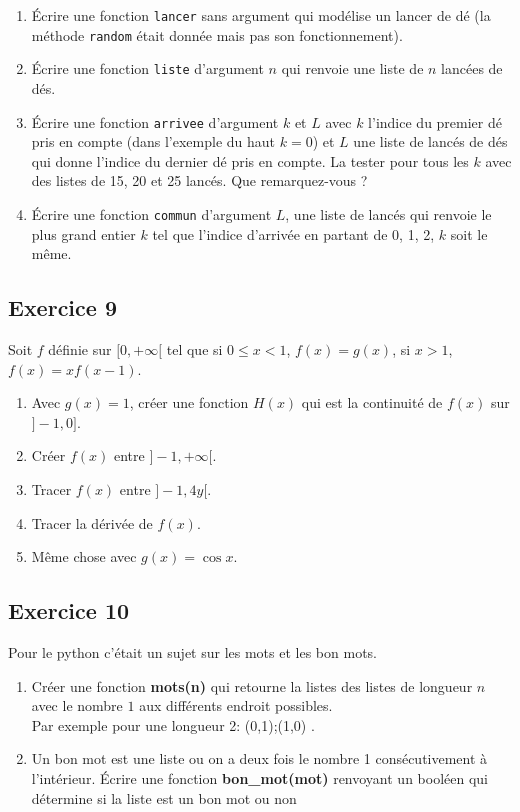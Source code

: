 \documentclass[10pt,fleqn]{article} %
\begin{document}
\begin{multicols}{2}
\begin{enumerate}
\item Écrire une fonction \texttt{lancer} sans argument qui modélise un lancer de dé (la méthode \texttt{random} était donnée mais pas son fonctionnement). 
\item Écrire une fonction \texttt{liste} d'argument $n$ qui renvoie une liste de $n$ lancées de dés. 
\item Écrire une fonction \texttt{arrivee} d'argument $k$ et $L$ avec $k$ l'indice du premier dé pris en compte (dans l'exemple du haut $k=0$) et $L$ une liste de lancés de dés qui donne l'indice du dernier dé pris en compte. La tester pour tous les $k$ avec des listes de 15, 20 et 25 lancés. Que remarquez-vous ?
\item Écrire une fonction \texttt{commun} d'argument $L$, une liste de lancés qui renvoie le plus grand entier $k$ tel que l'indice d'arrivée en partant de 0, 1, 2, $k$ soit le même.
\end{enumerate}

\subsection*{Exercice 9}
Soit $f$ définie sur $[0,+\infty[$ tel que si $0\leq x< 1$, $f(x)=g(x)$, si $x>1$, $f(x)=xf(x-1)$. 

\begin{enumerate}
\item Avec $g(x)=1$, créer une fonction $H(x)$ qui est la continuité de $f(x)$ sur $]-1,0]$. 
\item Créer $f(x)$ entre $]-1,+\infty[$.
\item Tracer $f(x)$ entre $]-1,4y[$.
\item Tracer la dérivée de $f(x)$.
\item Même chose avec $g(x)=\cos x$.
\end{enumerate}

\subsection*{Exercice 10}
Pour le python c'était un sujet sur les mots et les bon mots.
\begin{enumerate}
\item Créer une fonction \textbf{mots(n)} qui retourne la listes des listes de longueur $n$
avec le nombre $1$ aux différents endroit possibles. \\
Par exemple pour une longueur 2: (0,1);(1,0) .
\item Un bon mot est une liste ou on a deux fois le nombre 1 consécutivement
à l'intérieur.
Écrire une fonction \textbf{bon\_mot(mot)} renvoyant un booléen qui détermine
 si la liste est un bon mot ou non
\end{enumerate}


\end{multicols}
\end{document}
